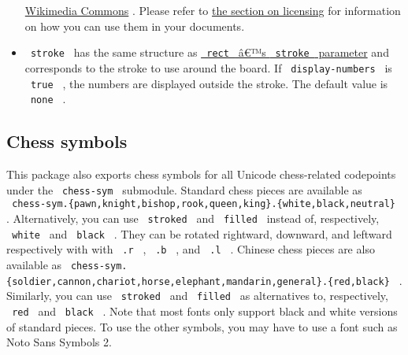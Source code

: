 \begin{itemize}
  \href{https://commons.wikimedia.org/wiki/Category:SVG_chess_pieces}{Wikimedia
  Commons} . Please refer to
  \href{https://github.com/typst/packages/raw/main/packages/preview/board-n-pieces/0.5.0/\#licensing}{the
  section on licensing} for information on how you can use them in your
  documents.
\item
  \texttt{\ stroke\ } has the same structure as
  \href{https://typst.app/docs/reference/visualize/rect/\#parameters-stroke}{\texttt{\ rect\ }
  â€™s \texttt{\ stroke\ } parameter} and corresponds to the stroke to
  use around the board. If \texttt{\ display-numbers\ } is
  \texttt{\ true\ } , the numbers are displayed outside the stroke. The
  default value is \texttt{\ none\ } .
\end{itemize}

\subsection{Chess symbols}\label{chess-symbols}

This package also exports chess symbols for all Unicode chess-related
codepoints under the \texttt{\ chess-sym\ } submodule. Standard chess
pieces are available as
\texttt{\ chess-sym.\{pawn,knight,bishop,rook,queen,king\}.\{white,black,neutral\}\ }
. Alternatively, you can use \texttt{\ stroked\ } and
\texttt{\ filled\ } instead of, respectively, \texttt{\ white\ } and
\texttt{\ black\ } . They can be rotated rightward, downward, and
leftward respectively with with \texttt{\ .r\ } , \texttt{\ .b\ } , and
\texttt{\ .l\ } . Chinese chess pieces are also available as
\texttt{\ chess-sym.\{soldier,cannon,chariot,horse,elephant,mandarin,general\}.\{red,black\}\ }
. Similarly, you can use \texttt{\ stroked\ } and \texttt{\ filled\ } as
alternatives to, respectively, \texttt{\ red\ } and \texttt{\ black\ } .
Note that most fonts only support black and white versions of standard
pieces. To use the other symbols, you may have to use a font such as
Noto Sans Symbols 2.

\begin{Shaded}
\begin{Highlighting}[]
\end{Highlighting}
\end{Shaded}

\pandocbounded{}

